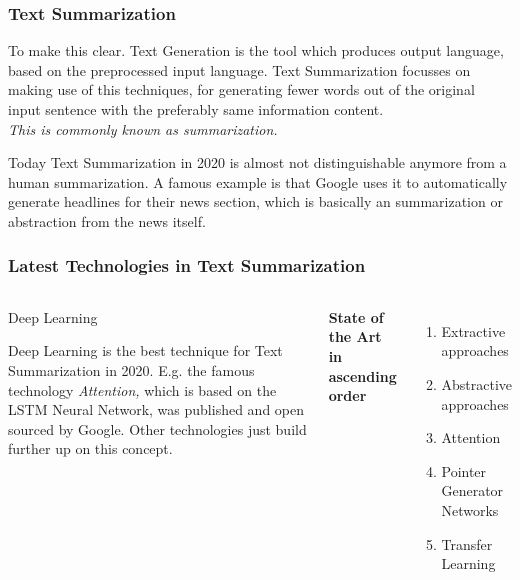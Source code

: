 \documentclass{beamer}
\begin{document}

\begin{frame}
\frametitle{Text Summarization}
To make this clear. Text Generation is the tool which produces output language, based on the preprocessed input language. Text Summarization focusses on making use of this techniques, for generating fewer words out of the original input sentence with the preferably same information content. \\
\textit{This is commonly known as summarization.}

\begin{block}{Today}
	Text Summarization in 2020 is almost not distinguishable anymore from a human summarization. A famous example is that Google uses it to automatically generate headlines for their news section, which is basically an summarization or abstraction from the news itself.
\end{block}
\end{frame}


\begin{frame}
	\frametitle{Latest Technologies in Text Summarization}
	\begin{columns}[c]
		
		\begin{block}{Deep Learning}
			
			Deep Learning is the best technique for Text Summarization in 2020. E.g. the famous technology \textit{Attention,} which is based on the LSTM Neural Network, was published and open sourced by Google. Other technologies just build further up on this concept.
		\end{block}
	
	   \textbf{State of the Art in ascending order}
		\begin{enumerate}
			\item Extractive approaches
			\item Abstractive approaches
			\item Attention 
			\item Pointer Generator Networks
			\item Transfer Learning
		\end{enumerate}
	\end{columns}

\end{frame}
\end{document}
